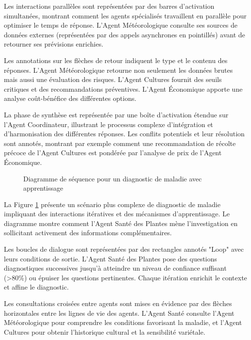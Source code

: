 Les interactions parallèles sont représentées par des barres d'activation simultanées, montrant comment les agents spécialisés travaillent en parallèle pour optimiser le temps de réponse. L'Agent Météorologique consulte ses sources de données externes (représentées par des appels asynchrones en pointillés) avant de retourner ses prévisions enrichies.

Les annotations sur les flèches de retour indiquent le type et le contenu des réponses. L'Agent Météorologique retourne non seulement les données brutes mais aussi une évaluation des risques. L'Agent Cultures fournit des seuils critiques et des recommandations préventives. L'Agent Économique apporte une analyse coût-bénéfice des différentes options.

La phase de synthèse est représentée par une boîte d'activation étendue sur l'Agent Coordinateur, illustrant le processus complexe d'intégration et d'harmonisation des différentes réponses. Les conflits potentiels et leur résolution sont annotés, montrant par exemple comment une recommandation de récolte précoce de l'Agent Cultures est pondérée par l'analyse de prix de l'Agent Économique.

\begin{figure}[h]
\centering
\caption{Diagramme de séquence pour un diagnostic de maladie avec apprentissage}
\label{fig:sequence_disease}
\end{figure}

La Figure \ref{fig:sequence_disease} présente un scénario plus complexe de diagnostic de maladie impliquant des interactions itératives et des mécanismes d'apprentissage. Le diagramme montre comment l'Agent Santé des Plantes mène l'investigation en sollicitant activement des informations complémentaires.

Les boucles de dialogue sont représentées par des rectangles annotés "Loop" avec leurs conditions de sortie. L'Agent Santé des Plantes pose des questions diagnostiques successives jusqu'à atteindre un niveau de confiance suffisant (>80\%) ou épuiser les questions pertinentes. Chaque itération enrichit le contexte et affine le diagnostic.

Les consultations croisées entre agents sont mises en évidence par des flèches horizontales entre les lignes de vie des agents. L'Agent Santé consulte l'Agent Météorologique pour comprendre les conditions favorisant la maladie, et l'Agent Cultures pour obtenir l'historique cultural et la sensibilité variétale.

